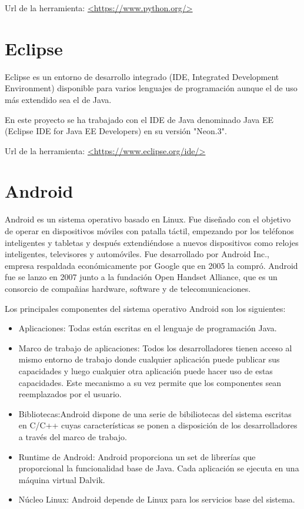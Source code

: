 Url de la herramienta: \url{<https://www.python.org/>}

\section{Eclipse}

Eclipse es un entorno de desarrollo integrado (IDE, Integrated Development Environment) disponible para varios lenguajes de programación aunque el de uso más extendido sea el de Java. 

En este proyecto se ha trabajado con el IDE de Java denominado Java EE (Eclipse IDE for Java EE Developers) en su versión "Neon.3".

Url de la herramienta: \url{<https://www.eclipse.org/ide/>}

\section{Android}

Android es un sistema operativo basado en Linux. Fue diseñado con el objetivo de operar en dispositivos móviles con patalla táctil, empezando por los teléfonos inteligentes y tabletas y después extendiéndose a nuevos dispositivos como relojes inteligentes, televisores y automóviles. Fue desarrollado por Android Inc., empresa respaldada económicamente por Google que en 2005 la compró. Android fue se lanzo en 2007 junto a la fundación Open Handset Alliance, que es un consorcio de compañias hardware, software y de telecomunicaciones.\cite{wiki:android}

Los principales componentes del sistema operativo Android son los siguientes:

\begin{itemize}
	\item{Aplicaciones}: Todas están escritas en el lenguaje de programación Java.
	\item{Marco de trabajo de aplicaciones}: Todos los desarrolladores tienen acceso al mismo entorno de trabajo donde cualquier aplicación puede publicar sus capacidades y luego cualquier otra aplicación puede hacer uso de estas capacidades. Este mecanismo a su vez permite que los componentes sean reemplazados por el usuario.
	\item{Bibliotecas}:Android dispone de una serie de bibiliotecas del sistema escritas en C/C++ cuyas características se ponen a disposición de los desarrolladores a través del marco de trabajo.
	\item{Runtime de Android}: Android proporciona un set de librerías que proporcional la funcionalidad base de Java. Cada aplicación se ejecuta en una máquina virtual Dalvik.
	\item{Núcleo Linux}: Android depende de Linux para los servicios base del sistema.
\end{itemize}


